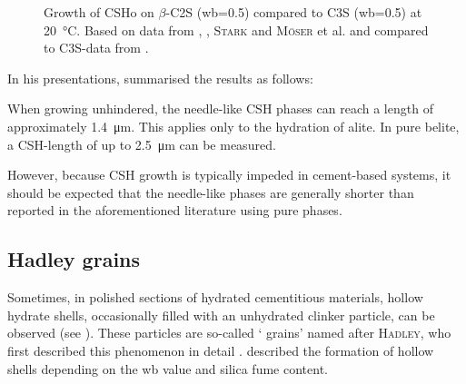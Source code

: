 \begin{figure}[!htb]
    \caption{
        Growth of \ac{CSHo} on $\beta$-\ac{C2S} (\ac{wb}=\num{0.5}) compared to \ac{C3S} (\ac{wb}=\num{0.5}) at \qty{20}{\celsius}. Based on data from \textcite{voland.2000}, \textcite{suess.2001}, \textsc{Stark} and \textsc{Möser} et al. \cite{stark.2001,moser.2002} and compared to \ac{C3S}-data from \textcite{bazzoni.2014}.
        }
    \label{fig:suess_CSH_C2S}
\end{figure}

In his presentations, \textcite{moser.2001}summarised the results as follows:
\begin{iquote}
When growing unhindered, the needle-like \ac{CSH} phases can reach a length of approximately \qty{1.4}{\micro\meter}.
This applies only to the hydration of alite.
In pure belite, a \ac{CSH}-length of up to \qty{2.5}{\micro\meter} can be measured.
\end{iquote}


However, because \ac{CSH} growth is typically impeded in cement-based systems, it should be expected that the needle-like phases are generally shorter than reported in the aforementioned literature using pure phases.

\subsection{Hadley grains}
\label{subsec:hadley}

Sometimes, in polished sections of hydrated cementitious materials, hollow hydrate shells, occasionally filled with an unhydrated clinker particle, can be observed (see ).
These particles are so-called `\textcite{hadley.1972} grains' named after \textsc{Hadley}, who first described this phenomenon in detail \cite{hadley.1972, hadley.2000}.
\textcite{kjellsen.1997} described the formation of hollow shells depending on the \ac{wb} value and silica fume content.

